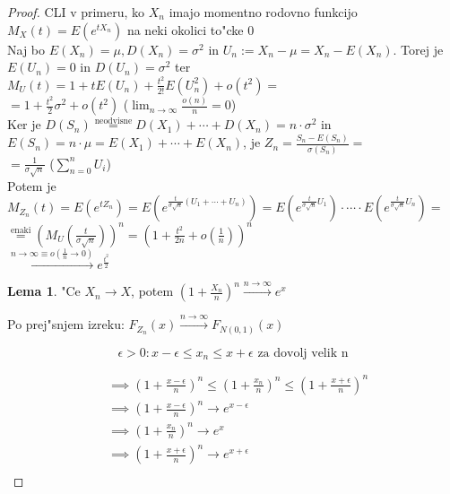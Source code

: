 \documentclass[a4paper,12pt]{article}
\theoremstyle{definition}
\newtheorem{lemma}[counter]{Lema}
\theoremstyle{remark}
\begin{document}
\begin{proof}
    CLI v primeru, ko $X_n$ imajo momentno rodovno funkcijo \\
    $M_X(t) = E(e^{t X_n})$ na neki okolici to"cke 0 \\
    Naj bo $E(X_n) = \mu, D(X_n) = \sigma^2$ in $U_n := X_n - \mu = X_n - E(X_n)$. Torej je $E(U_n) = 0$ in
    $D(U_n) = \sigma^2$ ter $M_{U}(t) = 1 + t E(U_n) + \frac{t^2}{2!} E(U_n^2) + o(t^2) =$ \\
    $= 1 + \frac{t^2}{2} \sigma^2 + o(t^2)$ ($\lim_{n \to \infty} \frac{o(n)}{n} = 0$) \\
    Ker je $D(S_n) \stackrel{\text{neodvisne}}{=} D(X_1) + \cdots + D(X_n) = n \cdot \sigma^2$ in
    $E(S_n) = n \cdot \mu = E(X_1) + \cdots + E(X_n)$, je $Z_n = \frac{S_n - E(S_n)}{\sigma(S_n)} =$ \\
    $= \frac{1}{\sigma \sqrt{n}}$ ($\sum_{n=0}^{n} U_i$) \\
    Potem je $M_{Z_n}(t) = E(e^{t Z_n}) = E(e^{\frac{t}{\sigma \sqrt{n}}(U_1 + \cdots + U_n)}) =
    E(e^{\frac{t}{\sigma \sqrt{n}} U_1}) \cdot \cdots \cdot E(e^{\frac{t}{\sigma \sqrt{n}} U_n}) =$ \\
    $\stackrel{\text{enaki}}{=} (M_U(\frac{t}{\sigma \sqrt{n}}))^n = (1 + \frac{t^2}{2n} + o(\frac{1}{n}))^n$ \\
    $\stackrel{n \to \infty \equiv o(\frac{1}{n} \to 0)}{\rightarrow} e^{\frac{t^2}{2}}$
    \begin{lemma}
        "Ce $X_n \to X$, potem $(1 + \frac{X_n}{n})^n \stackrel{n \to \infty}{\rightarrow} e^x$
    \end{lemma}
    Po prej"snjem izreku: $F_{Z_n}(x) \stackrel{n \to \infty}{\rightarrow} F_{N(0,1)}(x)$




    \begin{equation*}
        \epsilon > 0: x - \epsilon \leq x_n \leq x + \epsilon \text{ za dovolj velik n}
    \end{equation*}

    \begin{align*}
        &\implies (1 + \frac{x-\epsilon}{n})^n \leq (1 + \frac{x_n}{n})^n \leq (1 + \frac{x+\epsilon}{n})^n \\
        &\implies (1 + \frac{x-\epsilon}{n})^n \to e^{x-\epsilon} \\
        &\implies (1 + \frac{x_n}{n})^n \to e^{x} \\
        &\implies (1 + \frac{x+\epsilon}{n})^n \to e^{x+\epsilon} \\
    \end{align*}
\end{proof}
\end{document}
